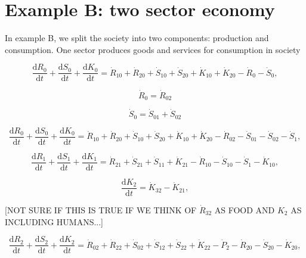 \section{Example B: two sector economy}
\label{sec:B_materials}

In example B, we split the society into two components: production and consumption. One sector produces goods and services for consumption in society

\begin{equation} \label{eq:CV_R_dot_0a}
	\frac{\mathrm{d}R_{0}}{\mathrm{d}t} 
	+ \frac{\mathrm{d}S_{0}}{\mathrm{d}t}	
	+ \frac{\mathrm{d}K_0}{\mathrm{d}t}
	=  \dot{R}_{10} + \dot{R}_{20} 
	+ \dot{S}_{10} + \dot{S}_{20} 
	+ \dot{K}_{10} + \dot{K}_{20} 
	- \dot{R}_{0} 
	- \dot{S}_{0},
\end{equation}

\begin{equation}
	\dot{R}_{0} = \dot{R}_{02}
\end{equation}

\begin{equation}
	\dot{S}_{0} = \dot{S}_{01} + \dot{S}_{02}
\end{equation}

\begin{equation} \label{eq:CV_R_dot_0b}
	\frac{\mathrm{d}R_{0}}{\mathrm{d}t} 
	+ \frac{\mathrm{d}S_{0}}{\mathrm{d}t}	 
	+ \frac{\mathrm{d}K_0}{\mathrm{d}t}
	=  \dot{R}_{10} + \dot{R}_{20} 
	+ \dot{S}_{10} + \dot{S}_{20} 
	+ \dot{K}_{10} + \dot{K}_{20} 
	- \dot{R}_{02} 
	- \dot{S}_{01} - \dot{S}_{02} - \dot{S}_{1},
\end{equation}

\begin{equation} \label{eq:CV_R_dot_1}
	\frac{\mathrm{d}R_{1}}{\mathrm{d}t} + \frac{\mathrm{d}S_{1}}{\mathrm{d}t}
	+ \frac{\mathrm{d}K_{1}}{\mathrm{d}t}
	=  \dot{R}_{21} 
	+ \dot{S}_{21} + \dot{S}_{11}
	+ \dot{K}_{21} 
	- \dot{R}_{10} 
	- \dot{S}_{10} - \dot{S}_{1}
	- \dot{K}_{10},
\end{equation}

\begin{equation} \label{eq:CV_K_dot_2}
	\frac{\mathrm{d}K_{2}}{\mathrm{d}t}
	=  \dot{K}_{32} - \dot{K}_{21},
\end{equation}

[NOT SURE IF THIS IS TRUE IF WE THINK OF $\dot{R}_{32}$ AS FOOD AND $K_{2}$ AS INCLUDING HUMANS...]

\begin{equation} \label{eq:CV_R_dot_2}
	\frac{\mathrm{d}R_{2}}{\mathrm{d}t} + \frac{\mathrm{d}S_{2}}{\mathrm{d}t}
	+ \frac{\mathrm{d}K_{2}}{\mathrm{d}t}
	=  \dot{R}_{02} + \dot{R}_{22} 
	+ \dot{S}_{02} + \dot{S}_{12} + \dot{S}_{22} 
	+ \dot{K}_{22}
	- \dot{P}_{2}
	- \dot{R}_{20} 
	- \dot{S}_{20} 
	- \dot{K}_{20},
\end{equation}

